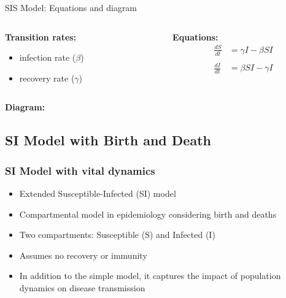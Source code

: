 \begin{frame}{SIS Model: Equations and diagram}
\begin{columns}[t]
\begin{column}{0.5\textwidth}
 \textbf{Transition rates:}
    \begin{itemize}
        \item infection rate ($\beta$) 
        \item  recovery rate ($\gamma$)
    \end{itemize}
        
    \end{column}
    \begin{column}{0.5\textwidth}
    \textbf{Equations:}
          \begin{align*}
            \frac{dS}{dt} &= \gamma I - \beta S I \\
            \\
            \frac{dI}{dt} &= \beta S I - \gamma I
          \end{align*}
    \end{column}
\end{columns}


\vfill
\textbf{Diagram:}
  \begin{center}
  \end{center}
\end{frame}

\subsection{SI Model with Birth and Death}

\begin{frame}
  \frametitle{SI Model with vital dynamics}
  \begin{itemize}
    \item Extended Susceptible-Infected (SI) model
    \item Compartmental model in epidemiology considering birth and deaths
    \item Two compartments: Susceptible (S) and Infected (I)
    \item Assumes no recovery or immunity
    \item In addition to the simple model, it captures the impact of population dynamics on disease transmission
  \end{itemize}
\end{frame}



